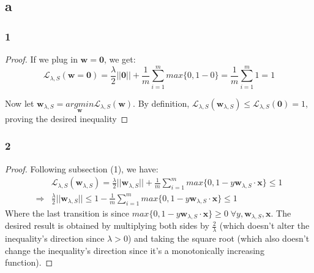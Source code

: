 \subsection*{a}
\subsubsection*{1}
\begin{proof}    
    If we plug in $\boldsymbol{w}=\boldsymbol{0}$, we get:
    \begin{equation*}
        \mathcal{L}_{\lambda, S}(\boldsymbol{w=0}) = \frac{\lambda}{2}||\boldsymbol{0}|| 
        + \frac{1}{m} \sum_{i=1}^{m} max\{0, 1-0\} = \frac{1}{m} \sum_{i=1}^{m} 1 = 1
    \end{equation*}
    
    Now let $\boldsymbol{w}_{\lambda, S} = \underset{\boldsymbol{w}}{argmin} \mathcal{L}_{\lambda, S}(\boldsymbol{w})$. By definition, $\mathcal{L}_{\lambda, S}(\boldsymbol{w}_{\lambda, S}) \leq \mathcal{L}_{\lambda, S}(\boldsymbol{0}) = 1$, proving the desired inequality
\end{proof}

\subsubsection*{2}
\begin{proof}
    Following subsection (1), we have:
    \begin{equation*}
        \begin{split}            
            & \mathcal{L}_{\lambda, S}(\boldsymbol{w}_{\lambda, S}) = \frac{\lambda}{2}||\boldsymbol{w}_{\lambda, S}|| 
            + \frac{1}{m} \sum_{i=1}^{m} max\{0, 1-y \boldsymbol{w}_{\lambda, S} \cdot \boldsymbol{x}\} \leq 1 \\
            \Rightarrow & \frac{\lambda}{2}||\boldsymbol{w}_{\lambda, S}|| \leq 1 - \frac{1}{m} \sum_{i=1}^{m} max\{0, 1-y \boldsymbol{w}_{\lambda, S} \cdot \boldsymbol{x}\} \leq 1
        \end{split}
    \end{equation*}
    Where the last transition is since $max\{0, 1-y \boldsymbol{w}_{\lambda, S} \cdot \boldsymbol{x}\} \geq 0 \; \forall y, \boldsymbol{w}_{\lambda, S}, \boldsymbol{x}$. The desired result is obtained by multiplying both sides by $\frac{2}{\lambda}$ (which doesn't alter the inequality's direction since $\lambda > 0$) and taking the square root (which also doesn't change the inequality's direction since it's a monotonically increasing function).
\end{proof}

